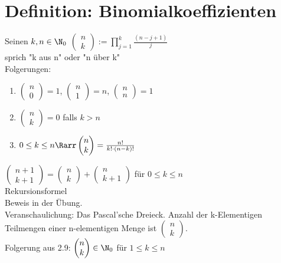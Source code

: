 \section{Definition: Binomialkoeffizienten}
Seinen $k, n \in \N_0$ $\begin{pmatrix}
n\\k
\end{pmatrix} := \prod_{j = 1}^{k} \frac{(n - j + 1)}{j}$\\
sprich "k aus n" oder "n über k"\\
Folgerungen:
\begin{enumerate}
\item $\begin{pmatrix}
n \\ 0
\end{pmatrix} = 1$,
$\begin{pmatrix}
n\\1
\end{pmatrix} = n$,
$\begin{pmatrix}
n\\n
\end{pmatrix} = 1$
\item $\begin{pmatrix}
n\\k
\end{pmatrix} = 0$ falls $k > n$\\
\item $0 \leq k \leq n \Rarr \begin{pmatrix}
n\\k
\end{pmatrix} = \frac{n!}{k! \cdot (n - k)!}$
\end{enumerate}
\Satz
$\begin{pmatrix}
n + 1\\k + 1
\end{pmatrix} = \begin{pmatrix}
n\\k
\end{pmatrix} + \begin{pmatrix}
n\\k +1
\end{pmatrix}$ für $0 \leq k \leq n$\\
Rekursionsformel\\
Beweis in der Übung.\\
Veranschaulichung: Das Pascal'sche Dreieck.
\Satz Anzahl der k-Elementigen Teilmengen einer n-elementigen Menge ist $\begin{pmatrix}
n\\k
\end{pmatrix}$.\\
Folgerung aus 2.9: $\begin{pmatrix}n\\k\end{pmatrix} \in \N_0$ für $1 ≤ k ≤ n$
